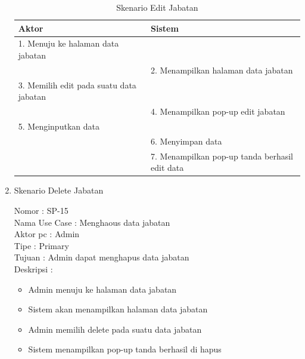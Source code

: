 \begin{enumerate}
\begin{itemize}
\end{itemize}

\begin{table}
	\caption{Skenario Edit Jabatan}
	\centering
	\begin{tabular}{ | l | p{65mm} |}
		\hline 
		\textbf{Aktor} & \textbf{Sistem} \\
		\hline
		
		1.	Menuju ke halaman data jabatan &  \\
		
		\hline
		
		&  2.	Menampilkan halaman data jabatan \\
		
		\hline
		
		3. Memilih edit pada suatu data jabatan & \\
		
		\hline
		
		& 4.	Menampilkan pop-up edit jabatan \\
		
		\hline
		
		5.	Menginputkan data  & \\
		\hline
		
		& 6.	Menyimpan data \\
		\hline
		
		& 7.	Menampilkan pop-up tanda berhasil edit data \\
		\hline
		
	\end{tabular}
\end{table}

\item Skenario Delete Jabatan

Nomor \kern 3.6pc : SP-15 \\
Nama Use Case : Menghaous data jabatan \\
Aktor  pc : Admin \\
Tipe \kern 4.6pc : Primary \\
Tujuan \kern 3.6pc : Admin dapat menghapus data jabatan \\
Deskripsi \kern 2.5pc : 

\begin{itemize}
	\item Admin menuju ke halaman data jabatan
	\item Sistem akan menampilkan halaman data jabatan
	\item Admin memilih delete pada suatu data jabatan
	\item Sistem menampilkan pop-up tanda berhasil di hapus
	

\end{itemize}
\end{enumerate}
